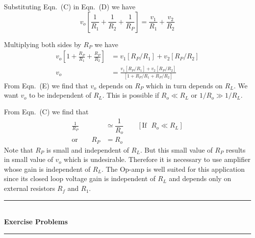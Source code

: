 \begin{solution}
\vfill\eject

Substituting Eqn.~(C) in Eqn.~(D) we have
$$
v_{o}\left[\frac{1}{R_{1}}+\frac{1}{R_{2}}+\frac{1}{R_{P}}\right]=\frac{v_{1}}{R_{1}}+\frac{v_{2}}{R_{2}}
$$

Multiplying both sides by $R_{P}$ we have
\begin{align*}
v_{o}\left[1+\frac{R_{P}}{R_{1}}+\frac{R_{P}}{R_{2}}\right] &= v_{1}[R_{P}/R_{1}]+v_{2}[R_{P}/R_{2}]\\[3pt]
v_{o} &= \frac{v_{1}[R_{P}/R_{1}]+v_{2}[R_{P}/R_{2}]}{[1+R_{P}/R_{1}+R_{P}/R_{2}]}\tag{E}
\end{align*}
From Eqn.~(E) we find that $v_{o}$ depends on $R_{P}$ which in turn depends on $R_{L}$. We want $v_{o}$ to be independent of $R_{L}$. This is possible if $R_{o}\ll R_{L}$ or $1/R_{o}\gg 1/R_{L}$.

From Eqn.~(C) we find that
\begin{align*}
\frac{1}{R_{P}} & \simeq \dfrac{1}{R_{o}}\qquad[\text{If~~} R_{o}\ll R_{L}]\\[3pt]
\text{or}\qquad R_{P} &= R_{o}
\end{align*}
Note that $R_{P}$ is small and independent of $R_{L}$. But this small value of $R_{P}$ results in small value of $v_{o}$ which is undesirable. Therefore it is necessary to use amplifier whose gain is independent of $R_{L}$. The Op-amp is well suited for this application since its closed loop voltage gain is independent of $R_{L}$ and depends only on external resistors $R_{f}$ and $R_{1}$.
\end{solution}


\smallskip
\begin{center}
\rule{5cm}{1pt}\\[-2pt]
{\bf Exercise Problems}\\[-4pt]
\rule{5cm}{1pt}
\end{center}

